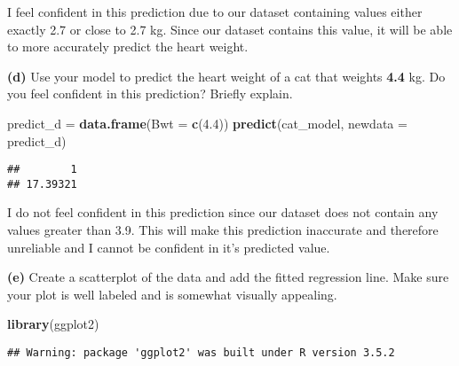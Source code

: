 \documentclass[]{article}
\newenvironment{Shaded}{\begin{snugshade}}{\end{snugshade}}
\newcommand{\KeywordTok}[1]{\textcolor[rgb]{0.13,0.29,0.53}{\textbf{#1}}}
\newcommand{\DataTypeTok}[1]{\textcolor[rgb]{0.13,0.29,0.53}{#1}}
\newcommand{\FloatTok}[1]{\textcolor[rgb]{0.00,0.00,0.81}{#1}}
\newcommand{\StringTok}[1]{\textcolor[rgb]{0.31,0.60,0.02}{#1}}
\newcommand{\NormalTok}[1]{#1}
\begin{document}
I feel confident in this prediction due to our dataset containing values
either exactly 2.7 or close to 2.7 kg. Since our dataset contains this
value, it will be able to more accurately predict the heart weight.

\textbf{(d)} Use your model to predict the heart weight of a cat that
weights \textbf{4.4} kg. Do you feel confident in this prediction?
Briefly explain.

\begin{Shaded}
\begin{Highlighting}[]
\NormalTok{predict_d =}\StringTok{ }\KeywordTok{data.frame}\NormalTok{(}\DataTypeTok{Bwt =} \KeywordTok{c}\NormalTok{(}\FloatTok{4.4}\NormalTok{))}
\KeywordTok{predict}\NormalTok{(cat_model, }\DataTypeTok{newdata =}\NormalTok{ predict_d)}
\end{Highlighting}
\end{Shaded}

\begin{verbatim}
##        1 
## 17.39321
\end{verbatim}

I do not feel confident in this prediction since our dataset does not
contain any values greater than 3.9. This will make this prediction
inaccurate and therefore unreliable and I cannot be confident in it's
predicted value.

\textbf{(e)} Create a scatterplot of the data and add the fitted
regression line. Make sure your plot is well labeled and is somewhat
visually appealing.

\begin{Shaded}
\begin{Highlighting}[]
\KeywordTok{library}\NormalTok{(ggplot2)}
\end{Highlighting}
\end{Shaded}

\begin{verbatim}
## Warning: package 'ggplot2' was built under R version 3.5.2
\end{verbatim}
\end{document}
